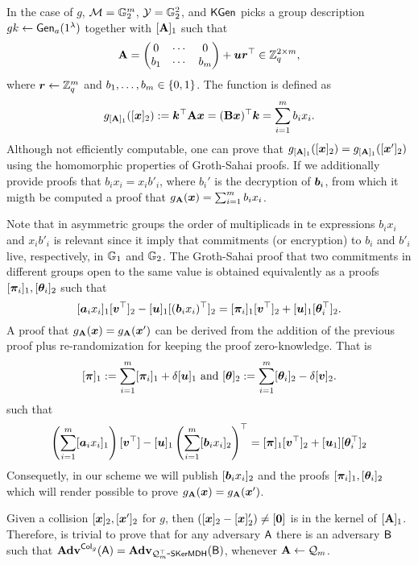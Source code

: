 In the case of $g$, $\mathcal{M}=\mathbb{G}^m_2$, $\mathcal{Y}=\mathbb{G}_2^2$, and $\mathsf{KGen}$ picks a group description $gk\gets\mathsf{Gen}_a(1^\lambda)$ together with $[\mathbf{{A}}]_1$ such that
$$
\mathbf{{A}}  = \left(\begin{matrix}0 & \cdots & 0\\ b_1 & \cdots & b_m\end{matrix}\right) +{\boldsymbol{u}}{\boldsymbol{r}}^\top \in\mathbb{Z}^{2\times m}_q,
$$
 where ${\boldsymbol{r}}\gets\mathbb{Z}_q^m$ and $b_1,\ldots,b_m\in\{0,1\}$. The function is defined as
$$
g_{[\mathbf{{A}}]_1}([{\boldsymbol{x}}]_2):= {\boldsymbol{k}}^\top\mathbf{{A}}{\boldsymbol{x}}=(\mathbf{{B}}{\boldsymbol{x}})^\top{\boldsymbol{k}}=\sum_{i=1}^m b_ix_i.
$$
Although not efficiently computable, one can prove that 
 $g_{[\mathbf{{A}}]_1}([{\boldsymbol{x}}]_2) = g_{[\mathbf{{A}}]_1}([{\boldsymbol{x}}']_2)$
 using the homomorphic properties of Groth-Sahai proofs. If we additionally provide proofs that $b_ix_i=x_ib'_i$, where $b_i'$ is the decryption of ${\boldsymbol{b}}_i$, from which it migth be computed a proof that $g_{\mathbf{{A}}}({\boldsymbol{x}})=\sum_{i=1}^m b_ix_i$.

Note that in asymmetric groups the order of multiplicads in te expressions $b_ix_i$ and $x_ib'_i$ is relevant since it imply that commitments (or encryption) to $b_i$ and $b'_i$ live, respectively, in $\mathbb{G}_1$ and $\mathbb{G}_2$. The Groth-Sahai proof that two commitments in different groups open to the same value is obtained equivalently as a proofs $[{\boldsymbol{\pi}}_i]_1,[{\boldsymbol{\theta}}_i]_2$ such that
$$ 
[{\boldsymbol{a}}_ix_i]_1[{\boldsymbol{v}}^\top]_2-[{\boldsymbol{u}}]_1[({\boldsymbol{b}}_ix_i)^\top]_2 =[{\boldsymbol{\pi}}_i]_1[{\boldsymbol{v}}^\top]_2+[{\boldsymbol{u}}]_1[{\boldsymbol{\theta}}^\top_i]_2.
$$
A proof that $g_{\mathbf{{A}}}({\boldsymbol{x}}) = g_{\mathbf{{A}}}({\boldsymbol{x}}')$ can be derived from the addition of the previous proof plus re-randomization for keeping the proof zero-knowledge. That is
$$
[{\boldsymbol{\pi}}]_1 := \sum_{i=1}^m [{\boldsymbol{\pi}}_i]_1+\delta[{\boldsymbol{u}}]_1
\text{ and }
[{\boldsymbol{\theta}}]_2 := \sum_{i=1}^m [{\boldsymbol{\theta}}_i]_2-\delta[{\boldsymbol{v}}]_2.
$$
such that
$$
\left(\sum_{i=1}^m [{\boldsymbol{a}}_ix_i]_1\right)[{\boldsymbol{v}}^\top]-[{\boldsymbol{u}}]_1\left(\sum_{i=1}^m[{\boldsymbol{b}}_ix_i]_2\right)^\top =
[{\boldsymbol{\pi}}]_1[{\boldsymbol{v}}^\top]_2 + [{\boldsymbol{u}}_1][{\boldsymbol{\theta}}_i^\top]_2
$$ Consequetly, in our scheme we will publish  $[{\boldsymbol{b}}_ix_i]_2$ and the proofs $[{\boldsymbol{\pi}}_i]_1,[{\boldsymbol{\theta}}_i]_2$ which will render possible to prove $g_{\mathbf{{A}}}({\boldsymbol{x}})=g_{\mathbf{{A}}}({\boldsymbol{x}}')$.

Given a collision $[{\boldsymbol{x}}]_2,[{\boldsymbol{x}}']_2$ for $g$, then $([{\boldsymbol{x}}]_2-[{\boldsymbol{x}}]'_2)\neq [{\boldsymbol{0}}]$ is in the kernel of $[\mathbf{{A}}]_1$. Therefore, is trivial to prove that for any adversary $\mathsf{A}$ there is an adversary $\mathsf{B}$ such that $\mathbf{Adv}^{\mathsf{Col}_g}(\mathsf{A})=\mathbf{Adv}_{\mathcal{Q}_m^\top\mbox{-}\mathsf{SKerMDH}}(\mathsf{B})$, whenever $\mathbf{{A}}\gets\mathcal{Q}_m$.


